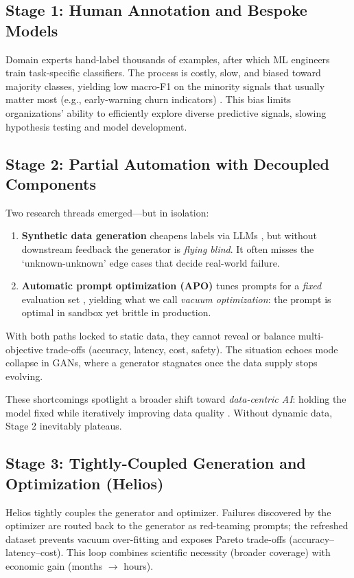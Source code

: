 \documentclass{article}
\begin{document}
\subsection{Stage 1: Human Annotation and Bespoke Models}
Domain experts hand-label thousands of examples, after which ML engineers train task-specific classifiers.  The process is costly, slow, and biased toward majority classes, yielding low macro-F1 on the minority signals that usually matter most (e.g., early-warning churn indicators) \citep{yu2023largelanguagemodelattributed}. This bias limits organizations' ability to efficiently explore diverse predictive signals, slowing hypothesis testing and model development.

\subsection{Stage 2: Partial Automation with Decoupled Components}
Two research threads emerged—but in isolation:

\begin{enumerate}
  \item \textbf{Synthetic data generation} cheapens labels via LLMs \citep{patel2024datadreamertoolsyntheticdata}, but without downstream feedback the generator is \emph{flying blind}. It often misses the `unknown-unknown' edge cases that decide real-world failure.
  \item \textbf{Automatic prompt optimization (APO)} tunes prompts for a \emph{fixed} evaluation set \citep{pryzant2023automaticpromptoptimizationgradient,lester2021powerscaleparameterefficientprompt}, yielding what we call \emph{vacuum optimization}: the prompt is optimal in sandbox yet brittle in production.
\end{enumerate}

With both paths locked to static data, they cannot reveal or balance multi-objective trade-offs (accuracy, latency, cost, safety). The situation echoes mode collapse in GANs, where a generator stagnates once the data supply stops evolving.

These shortcomings spotlight a broader shift toward \textit{data-centric AI}: holding the model fixed while iteratively improving data quality \citep{ng2021datacentricai, mahalle2024datacentric}. Without dynamic data, Stage 2 inevitably plateaus.

\subsection{Stage 3: Tightly-Coupled Generation and Optimization (Helios)}
Helios tightly couples the generator and optimizer. Failures discovered by the optimizer are routed back to the generator as red-teaming prompts; the refreshed dataset prevents vacuum over-fitting and exposes Pareto trade-offs (accuracy–latency–cost). This loop combines scientific necessity (broader coverage) with economic gain (months $\rightarrow$ hours).
\end{document}
